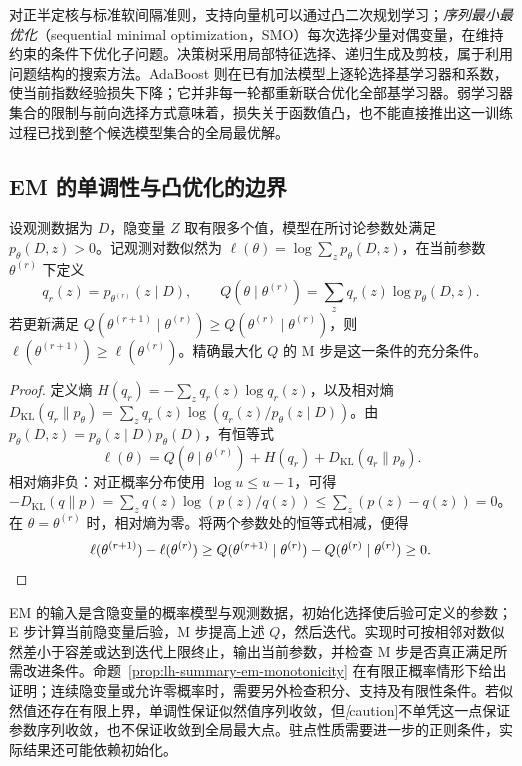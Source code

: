 对正半定核与标准软间隔准则，支持向量机可以通过凸二次规划学习；\emph{序列最小最优化}（sequential minimal optimization，SMO）每次选择少量对偶变量，在维持约束的条件下优化子问题。决策树采用局部特征选择、递归生成及剪枝，属于利用问题结构的搜索方法。AdaBoost 则在已有加法模型上逐轮选择基学习器和系数，使当前指数经验损失下降；它并非每一轮都重新联合优化全部基学习器。弱学习器集合的限制与前向选择方式意味着，损失关于函数值凸，也不能直接推出这一训练过程已找到整个候选模型集合的全局最优解。

\subsection{EM 的单调性与凸优化的边界}
\label{subsec:lh-summary-guarantees}

\begin{proposition}[EM 的似然单调性]
\label{prop:lh-summary-em-monotonicity}
设观测数据为 $D$，隐变量 $Z$ 取有限多个值，模型在所讨论参数处满足 $p_\theta(D,z)>0$。记观测对数似然为 $\ell(\theta)=\log\sum_z p_\theta(D,z)$，在当前参数 $\theta^{(r)}$ 下定义
\[
q_r(z)=p_{\theta^{(r)}}(z\mid D),\qquad
Q(\theta\mid\theta^{(r)})=\sum_z q_r(z)\log p_\theta(D,z).
\]
若更新满足 $Q(\theta^{(r+1)}\mid\theta^{(r)})\geq Q(\theta^{(r)}\mid\theta^{(r)})$，则 $\ell(\theta^{(r+1)})\geq\ell(\theta^{(r)})$。精确最大化 $Q$ 的 M 步是这一条件的充分条件。
\end{proposition}
\begin{proof}
定义熵 $H(q_r)=-\sum_zq_r(z)\log q_r(z)$，以及相对熵
$D_{\mathrm{KL}}(q_r\|p_\theta)=\sum_zq_r(z)\log(q_r(z)/p_\theta(z\mid D))$。由 $p_\theta(D,z)=p_\theta(z\mid D)p_\theta(D)$，有恒等式
\[
\ell(\theta)=Q(\theta\mid\theta^{(r)})+H(q_r)
+D_{\mathrm{KL}}(q_r\|p_\theta).
\]
相对熵非负：对正概率分布使用 $\log u\leq u-1$，可得
$-D_{\mathrm{KL}}(q\|p)=\sum_zq(z)\log(p(z)/q(z))\leq\sum_z(p(z)-q(z))=0$。
在 $\theta=\theta^{(r)}$ 时，相对熵为零。将两个参数处的恒等式相减，便得
\[
\ell(\theta^{(r+1)})-\ell(\theta^{(r)})
\geq Q(\theta^{(r+1)}\mid\theta^{(r)})-Q(\theta^{(r)}\mid\theta^{(r)})\geq0.\qedhere
\]
\end{proof}

EM 的输入是含隐变量的概率模型与观测数据，初始化选择使后验可定义的参数；E 步计算当前隐变量后验，M 步提高上述 $Q$，然后迭代。实现时可按相邻对数似然差小于容差或达到迭代上限终止，输出当前参数，并检查 M 步是否真正满足所需改进条件。命题~\ref{prop:lh-summary-em-monotonicity} 在有限正概率情形下给出证明；连续隐变量或允许零概率时，需要另外检查积分、支持及有限性条件。若似然值还存在有限上界，单调性保证似然值序列收敛，但\emph[caution]{不单凭这一点保证参数序列收敛，也不保证收敛到全局最大点}。驻点性质需要进一步的正则条件，实际结果还可能依赖初始化。

